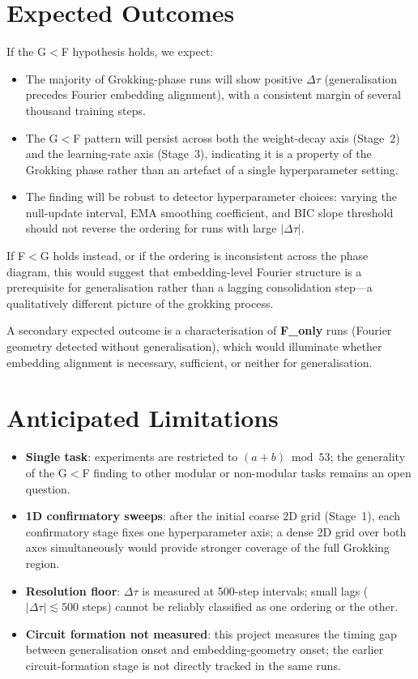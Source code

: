 \documentclass[12pt,openany,a4paper]{book}
\newcommand{\Dtau}{\Delta\tau}
\begin{document}
\section{Expected Outcomes}

If the G$<$F hypothesis holds, we expect:
\begin{itemize}
  \item The majority of Grokking-phase runs will show positive $\Dtau$
    (generalisation precedes Fourier embedding alignment), with a
    consistent margin of several thousand training steps.
  \item The G$<$F pattern will persist across both the weight-decay axis
    (Stage~2) and the learning-rate axis (Stage~3), indicating it is a
    property of the Grokking phase rather than an artefact of a single
    hyperparameter setting.
  \item The finding will be robust to detector hyperparameter choices:
    varying the null-update interval, EMA smoothing coefficient, and BIC
    slope threshold should not reverse the ordering for runs with large
    $|\Dtau|$.
\end{itemize}

If F$<$G holds instead, or if the ordering is inconsistent across the
phase diagram, this would suggest that embedding-level Fourier structure
is a prerequisite for generalisation rather than a lagging consolidation
step---a qualitatively different picture of the grokking process.

A secondary expected outcome is a characterisation of \textbf{F\_only}
runs (Fourier geometry detected without generalisation), which would
illuminate whether embedding alignment is necessary, sufficient, or
neither for generalisation.

\section{Anticipated Limitations}

\begin{itemize}
  \item \textbf{Single task}: experiments are restricted to
    $(a+b)\bmod 53$; the generality of the G$<$F finding to other
    modular or non-modular tasks remains an open question.
  \item \textbf{1D confirmatory sweeps}: after the initial coarse 2D
    grid (Stage~1), each confirmatory stage fixes one hyperparameter
    axis; a dense 2D grid over both axes simultaneously would provide
    stronger coverage of the full Grokking region.
  \item \textbf{Resolution floor}: $\Dtau$ is measured at 500-step
    intervals; small lags ($|\Dtau|\lesssim500$ steps) cannot be
    reliably classified as one ordering or the other.
  \item \textbf{Circuit formation not measured}: this project measures
    the timing gap between generalisation onset and embedding-geometry
    onset; the earlier circuit-formation stage is not directly tracked
    in the same runs.
\end{itemize}
\end{document}
